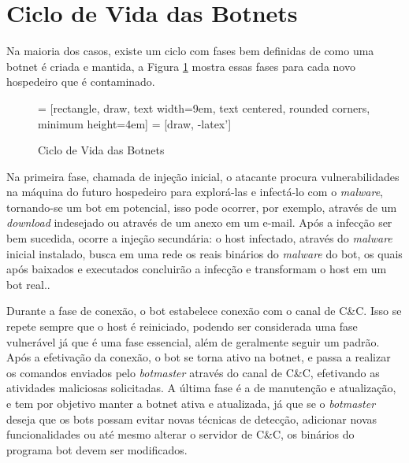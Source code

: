 \section{Ciclo de Vida das Botnets}
Na maioria dos casos, existe um ciclo com fases bem definidas de como uma botnet é criada e mantida, a Figura \ref{fig:botnets_lifecycle} mostra essas fases para cada novo hospedeiro que é contaminado.

\begin{figure}
 = [rectangle, draw, text width=9em, text centered, rounded corners, minimum height=4em]
 = [draw, -latex']
\centering
{}
\caption[Ciclo de Vida das Botnets]{Ciclo de Vida das Botnets} \label{fig:botnets_lifecycle}
\end{figure}

Na primeira fase, chamada de injeção inicial, o atacante procura vulnerabilidades na máquina do futuro hospedeiro para explorá-las e infectá-lo com o \textit{malware}, tornando-se um bot em potencial, isso pode ocorrer, por exemplo, através de um \textit{download} indesejado ou através de um anexo em um e-mail. Após a infecção ser bem sucedida, ocorre a injeção secundária: o host infectado, através do \textit{malware} inicial instalado, busca em uma rede os reais binários do \textit{malware} do bot, os quais após baixados e executados concluirão a infecção e transformam o host em um bot real.\cite{feily2009survey}.

Durante a fase de conexão, o bot estabelece conexão com o canal de C\&C. Isso se repete sempre que o host é reiniciado, podendo ser considerada uma fase vulnerável já que é uma fase essencial, além de geralmente seguir um padrão. Após a efetivação da conexão, o bot se torna ativo na botnet, e passa a realizar os comandos enviados pelo \textit{botmaster} através do canal de C\&C, efetivando as atividades maliciosas solicitadas. A última fase é a de manutenção e atualização, e tem por objetivo manter a botnet ativa e atualizada, já que se o \textit{botmaster} deseja que os bots possam evitar novas técnicas de detecção, adicionar novas funcionalidades ou até mesmo alterar o servidor de C\&C, os binários do programa bot devem ser modificados.

